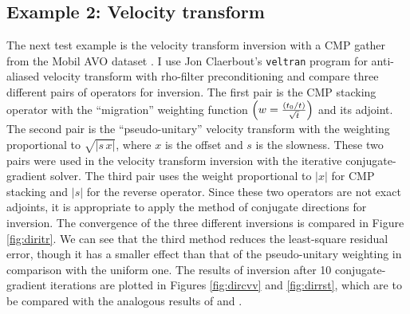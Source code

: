 

\subsection{Example 2: Velocity transform}


The next test example is the velocity transform inversion with a CMP
gather from the Mobil AVO dataset
\cite[]{Nichols.sep.82.1,Lumley.sep.82.25,Lumley.sep.82.63}. I use Jon
Claerbout's \verb!veltran! program \cite[]{Claerbout.bei.95} for
anti-aliased velocity transform with rho-filter preconditioning
and compare three different pairs of operators for inversion. The
first pair is the CMP stacking operator with the ``migration''
weighting function $\left(w = {{\left(t_0/t\right)} \over
\sqrt{t}}\right)$ and its adjoint. The second pair is
the ``pseudo-unitary'' velocity transform with the weighting
proportional to $\sqrt{|s\,x|}$, where $x$ is the offset and $s$ is
the slowness. These two pairs were used in the velocity transform
inversion with the iterative conjugate-gradient solver. The third pair
uses the weight proportional to $|x|$ for CMP stacking and $|s|$ for
the reverse operator. Since these two operators are not exact
adjoints, it is appropriate to apply the method of conjugate
directions for inversion. The convergence of the three different
inversions is compared in Figure \ref{fig:diritr}. We can see that the
third method reduces the least-square residual error, though it has a
smaller effect than that of the pseudo-unitary weighting in comparison
with the uniform one. The results of inversion after 10
conjugate-gradient iterations are plotted in Figures \ref{fig:dircvv} and
\ref{fig:dirrst}, which are to be compared with the analogous results of
\cite{Lumley.sep.82.63} and \cite{Nichols.sep.82.1}.


